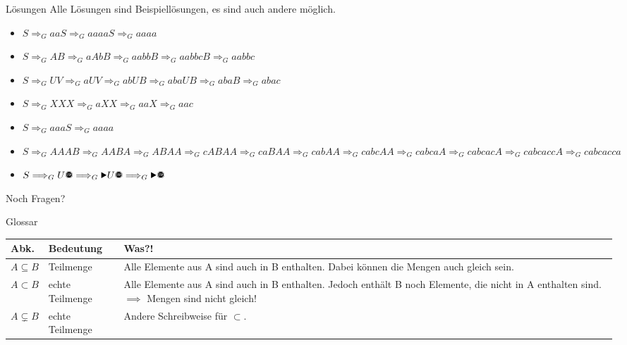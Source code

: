 {
\begin{frame}{Lösungen}
Alle Lösungen sind Beispiellösungen, es sind auch andere möglich.
    \begin{itemize}[<+- | alert@+>]
        \item $S\Longrightarrow_G aaS \Longrightarrow_G aaaaS \Longrightarrow_G aaaa$
        \item $S\Longrightarrow_G AB \Longrightarrow_G aAbB \Longrightarrow_G aabbB \Longrightarrow_G aabbcB \Longrightarrow_G aabbc$
        \item $S\Longrightarrow_G UV \Longrightarrow_G aUV \Longrightarrow_G abUB \Longrightarrow_G abaUB \Longrightarrow_G abaB \Longrightarrow_G abac$
        \item $S\Longrightarrow_G XXX \Longrightarrow_G aXX \Longrightarrow_G aaX \Longrightarrow_G aac$
        \item $S\Longrightarrow_G aaaS \Longrightarrow_G aaaa$
        \item $S\Longrightarrow_G AAAB \Longrightarrow_G AABA \Longrightarrow_G ABAA \Longrightarrow_G cABAA \Longrightarrow_G caBAA \Longrightarrow_G cabAA \Longrightarrow_G cabcAA \Longrightarrow_G cabcaA\Longrightarrow_G cabcacA \Longrightarrow_G cabcaccA \Longrightarrow_G cabcacca$
        \item $S\Longrightarrow_G U\text{\Stopsign} \Longrightarrow_G \text{\Forward}U\text{\Stopsign} \Longrightarrow_G \text{\Forward}\text{\Stopsign}$
    \end{itemize}
\end{frame}
}  

\begin{frame}[standout]
  Noch Fragen?
\end{frame}

\begin{frame}[fragile]{Glossar}
    \small
    \begin{tabular}{p{} p{} p{}}
    \toprule
    Abk.&Bedeutung&Was?!\\
    \midrule
        $A \subseteq B$ & Teilmenge & Alle Elemente aus A sind auch in B enthalten. Dabei können die Mengen auch gleich sein.\\
        $A \subset B$ & echte Teilmenge & Alle Elemente aus A sind auch in B enthalten. Jedoch enthält B noch Elemente, die nicht in A enthalten sind.
        $\implies$ Mengen sind nicht gleich!\\
        $A \subsetneq B$ & echte Teilmenge & Andere Schreibweise für $\subset$.\\
    \bottomrule
    \end{tabular}
\end{frame}


